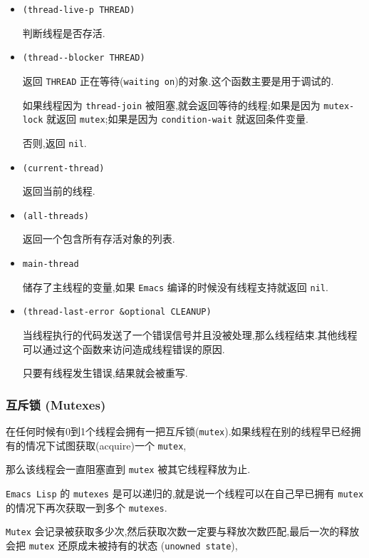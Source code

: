 \documentclass[11pt]{article}
\begin{document}
\begin{itemize}
\item \texttt{(thread-live-p THREAD)}

判断线程是否存活.

\item \texttt{(thread-{}-{}blocker THREAD)}

返回 \texttt{THREAD} 正在等待(\texttt{waiting on})的对象.这个函数主要是用于调试的.

如果线程因为 \texttt{thread-join} 被阻塞,就会返回等待的线程;如果是因为 \texttt{mutex-lock} 就返回 \texttt{mutex};如果是因为 \texttt{condition-wait} 就返回条件变量.

否则,返回 \texttt{nil}.

\item \texttt{(current-thread)}

返回当前的线程.

\item \texttt{(all-threads)}

返回一个包含所有存活对象的列表.

\item \texttt{main-thread}

储存了主线程的变量,如果 \texttt{Emacs} 编译的时候没有线程支持就返回 \texttt{nil}.

\item \texttt{(thread-last-error \&optional CLEANUP)}

当线程执行的代码发送了一个错误信号并且没被处理,那么线程结束.其他线程可以通过这个函数来访问造成线程错误的原因.

只要有线程发生错误,结果就会被重写.
\end{itemize}


\subsubsection{互斥锁 (Mutexes)}
\label{sec:orgbcb30a2}

在任何时候有0到1个线程会拥有一把互斥锁(\texttt{mutex}).如果线程在别的线程早已经拥有的情况下试图获取(acquire)一个 \texttt{mutex},

那么该线程会一直阻塞直到 \texttt{mutex} 被其它线程释放为止.

\texttt{Emacs Lisp} 的 \texttt{mutexes} 是可以递归的,就是说一个线程可以在自己早已拥有 \texttt{mutex} 的情况下再次获取一到多个 \texttt{mutexes}.

\texttt{Mutex} 会记录被获取多少次,然后获取次数一定要与释放次数匹配,最后一次的释放会把 \texttt{mutex} 还原成未被持有的状态 (\texttt{unowned state}),
\end{document}
